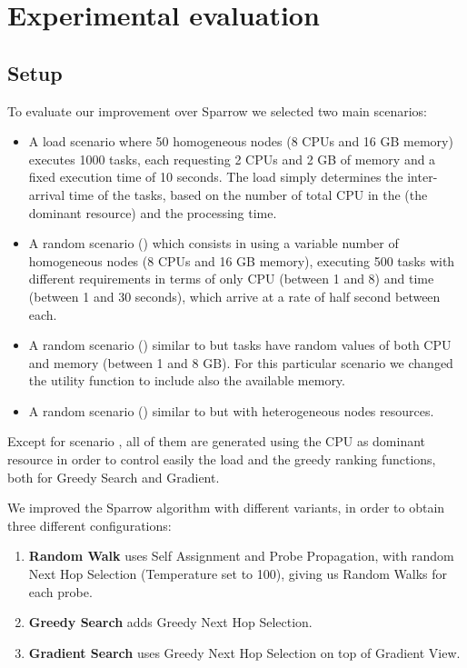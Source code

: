 \documentclass[conference]{IEEEtran}
\begin{document}
\section{Experimental evaluation}\label{sec:Evaluation}

  \subsection{Setup}
  To evaluate our improvement over Sparrow we selected two main scenarios:
  \begin{itemize}

    \item A load scenario where 50 homogeneous nodes (8 CPUs and 16 GB
      memory) executes 1000 tasks, each requesting 2 CPUs and 2 GB of
      memory and a fixed execution time of 10 seconds. The load simply
      determines the inter-arrival time of the tasks, based on the number
      of total CPU in the \dc (the dominant resource) and the processing
      time.

    \item A random scenario () which consists in using  a
      variable number of homogeneous nodes (8 CPUs and 16 GB memory),
      executing 500 tasks with different requirements in terms of only CPU
      (between 1 and 8) and time (between 1 and 30 seconds), which arrive
      at a rate of half second between each.

    \item A random scenario () similar to  but
      tasks have random values of both CPU and memory (between 1 and 8
      GB). For this particular scenario we changed the utility function to
      include also the available memory.

    \item A random scenario () similar to  but
      with heterogeneous nodes resources.

  \end{itemize}

  Except for scenario , all of them are generated using the
  CPU as dominant resource in order to control easily the load and the
  greedy ranking functions, both for Greedy Search and Gradient.

  We improved the Sparrow algorithm with different variants, in
  order to obtain three different configurations:
  \begin{enumerate}

    \item \textbf{Random Walk} uses Self Assignment and Probe Propagation,
      with random Next Hop Selection (Temperature set to 100), giving us
      Random Walks for each probe. 

    \item \textbf{Greedy Search} adds Greedy Next Hop Selection.

    \item \textbf{Gradient Search} uses Greedy Next Hop Selection on top
      of Gradient View.

  \end{enumerate}
\end{document}
